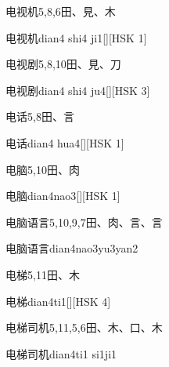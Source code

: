 \begin{entry}{电视机}{5,8,6}{⽥、⾒、⽊}
  \begin{phonetics}{电视机}{dian4 shi4 ji1}[][HSK 1]
  \end{phonetics}
\end{entry}

\begin{entry}{电视剧}{5,8,10}{⽥、⾒、⼑}
  \begin{phonetics}{电视剧}{dian4 shi4 ju4}[][HSK 3]
  \end{phonetics}
\end{entry}

\begin{entry}{电话}{5,8}{⽥、⾔}
  \begin{phonetics}{电话}{dian4 hua4}[][HSK 1]
  \end{phonetics}
\end{entry}

\begin{entry}{电脑}{5,10}{⽥、⾁}
  \begin{phonetics}{电脑}{dian4nao3}[][HSK 1]
  \end{phonetics}
\end{entry}

\begin{entry}{电脑语言}{5,10,9,7}{⽥、⾁、⾔、⾔}
  \begin{phonetics}{电脑语言}{dian4nao3yu3yan2}
  \end{phonetics}
\end{entry}

\begin{entry}{电梯}{5,11}{⽥、⽊}
  \begin{phonetics}{电梯}{dian4ti1}[][HSK 4]
  \end{phonetics}
\end{entry}

\begin{entry}{电梯司机}{5,11,5,6}{⽥、⽊、⼝、⽊}
  \begin{phonetics}{电梯司机}{dian4ti1 si1ji1}
  \end{phonetics}
\end{entry}

